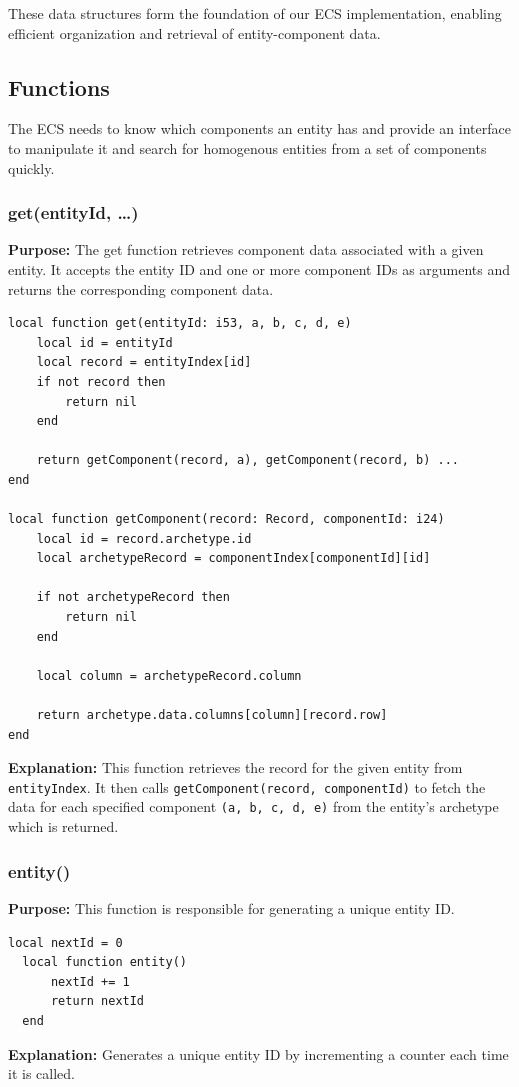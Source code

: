 \documentclass[openany, amssymb, psamsfonts]{amsart}
\theoremstyle{definition}
\numberwithin{equation}{section}
\begin{document}
These data structures form the foundation of our ECS implementation, enabling efficient organization and retrieval of entity-component data.

\subsection{Functions}

The ECS needs to know which components an entity has and provide an interface to manipulate it and search for 
homogenous entities from a set of components quickly.

\subsubsection{get(entityId, \ldots)}
\textbf{Purpose:} The get function retrieves component data associated with a given entity. It accepts the entity ID and one or more component IDs as arguments and returns the corresponding component data.
\begin{lstlisting}[style=lua]
local function get(entityId: i53, a, b, c, d, e) 
    local id = entityId
    local record = entityIndex[id]
    if not record then 
        return nil
    end

    return getComponent(record, a), getComponent(record, b) ...
end

local function getComponent(record: Record, componentId: i24)
    local id = record.archetype.id
    local archetypeRecord = componentIndex[componentId][id]

    if not archetypeRecord then 
        return nil
    end

    local column = archetypeRecord.column

    return archetype.data.columns[column][record.row]
end

\end{lstlisting}
\textbf{Explanation:} 
This function retrieves the record for the given entity from \texttt{entityIndex}. It 
then calls \texttt{getComponent(record, componentId)} to fetch the data for each specified 
component \texttt{(a, b, c, d, e)} from the entity's archetype which is returned.

\subsubsection{entity()}
\textbf{Purpose:} This function is responsible for generating a unique entity ID.
\begin{lstlisting}[style=lua]
  local nextId = 0
  local function entity()
      nextId += 1
      return nextId
  end
\end{lstlisting}
\textbf{Explanation:} 
Generates a unique entity ID by incrementing a counter each time it is called.
\end{document}
